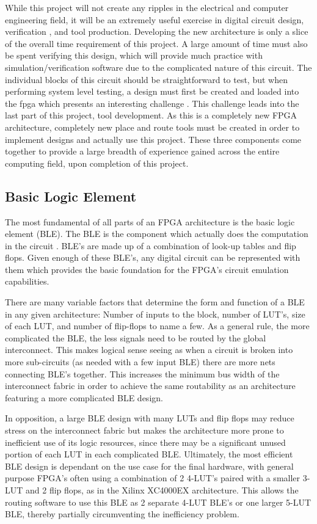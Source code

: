 \documentclass[12pt]{article}
\begin{document}
While this project will not create any ripples in the electrical and computer engineering 
field, it will be an extremely useful exercise in digital circuit design, verification
, and tool production. Developing the new architecture is only a slice of the overall 
time requirement of this project. A large amount of time must also be spent verifying 
this design, which will provide much practice with simulation/verification software 
due to the complicated nature of this circuit. The individual blocks of this circuit 
should be straightforward to test, but when performing system level testing, a design 
must first be created and loaded into the fpga which presents an interesting challenge
. This challenge leads into the last part of this project, tool development. As this 
is a completely new FPGA architecture, completely new place and route tools must 
be created in order to implement designs and actually use this project. These three 
components come together to provide a large breadth of experience gained across the 
entire computing field, upon completion of this project.

\subsection{Basic Logic Element}

The most fundamental of all parts of an FPGA architecture is the basic logic element 
(BLE). The BLE is the component which actually does the computation in the circuit
. BLE’s are made up of a combination of look-up tables and flip flops. Given enough 
of these BLE’s, any digital circuit can be represented with them which provides the 
basic foundation for the FPGA’s circuit emulation capabilities.

There are many variable factors that determine the form and function of a BLE in 
any given architecture: Number of inputs to the block, number of LUT’s, size of each 
LUT, and number of flip-flops to name a few. As a general rule, the more complicated 
the BLE, the less signals need to be routed by the global interconnect. This makes 
logical sense seeing as when a circuit is broken into more sub-circuits (as needed 
with a few input BLE) there are more nets connecting BLE’s together. This increases 
the minimum bus width of the interconnect fabric in order to achieve the same routability 
as an architecture featuring a more complicated BLE design.

In opposition, a large BLE design with many LUTs and flip flops may reduce stress 
on the interconnect fabric but makes the architecture more prone to inefficient use 
of its logic resources, since there may be a significant unused portion of each LUT 
in each complicated BLE. Ultimately, the most efficient BLE design is dependant on 
the use case for the final hardware, with general purpose FPGA’s often using a combination 
of 2 4-LUT’s paired with a smaller 3-LUT and 2 flip flops, as in the Xilinx XC4000EX 
architecture. This allows the routing software to use this BLE as 2 separate 4-LUT 
BLE’s or one larger 5-LUT BLE, thereby partially circumventing the inefficiency problem. 
\end{document}
